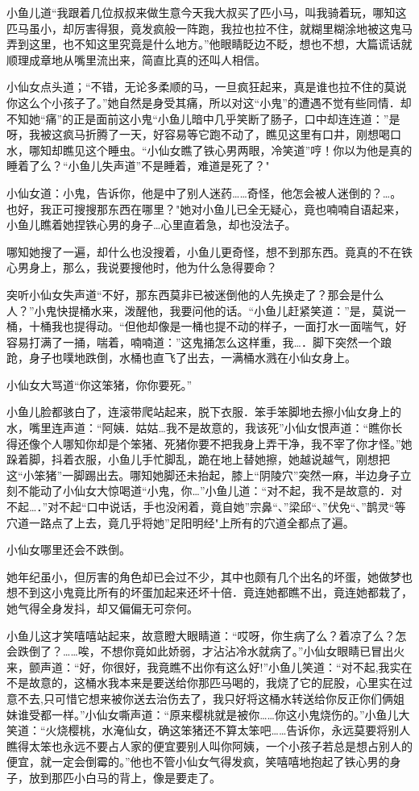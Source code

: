 \documentclass[12pt,oneside]{book}
\begin{document}
小鱼儿道``我跟着几位叔叔来做生意今天我大叔买了匹小马，叫我骑着玩，哪知这匹马虽小，却厉害得狠，竟发疯般一阵跑，我拉也拉不住，就糊里糊涂地被这鬼马弄到这里，也不知这里究竟是什么地方。''他眼睛眨边不眨，想也不想，大篇谎话就顺理成章地从嘴里流出来，简直比真的还叫人相信。

小仙女点头道；``不错，无论多柔顺的马，一旦疯狂起来，真是谁也拉不住的莫说你这么个小孩子了。''她自然是身受其痛，所以对这``小鬼''的遭遇不觉有些同情．却不知她``痛''的正是面前这小鬼``小鱼儿暗中几乎笑断了肠子，口中却连连道：''是呀，我被这疯马折腾了一天，好容易等它跑不动了，瞧见这里有口井，刚想喝口水，哪知却瞧见这个睡虫。``小仙女瞧了铁心男两眼，冷笑道''哼！你以为他是真的睡着了么？``小鱼儿失声道''不是睡着，难道是死了？"

小仙女道：小鬼，告诉你，他是中了别人迷药\ldots\ldots 奇怪，他怎会被人迷倒的？\ldots。也好，我正可搜搜那东西在哪里？"她对小鱼儿已全无疑心，竟也喃喃自语起来，小鱼儿瞧着她捏铁心男的身子\ldots 心里直着急，却也没法子。

哪知她搜了一遍，却什么也没搜着，小鱼儿更奇怪，想不到那东西。竟真的不在铁心男身上，那么，我说要搜他时，他为什么急得要命？

突听小仙女失声道``不好，那东西莫非已被迷倒他的人先换走了？那会是什么人？''小鬼快提桶水来，泼醒他，我要问他的话。``小鱼儿赶紧笑道：''是，莫说一桶，十桶我也提得动。``但他却像是一桶也提不动的样子，一面打水一面喘气，好容易打满了一捅，喘着，喃喃道：''这鬼捅怎么这样重，我\ldots．脚下突然一个踉跄，身子也噗地跌倒，水桶也直飞了出去，一满桶水溅在小仙女身上。

小仙女大骂道``你这笨猪，你你要死。''

小鱼儿脸都骇白了，连滚带爬站起来，脱下衣服．笨手笨脚地去擦小仙女身上的水，嘴里连声道：``阿姨．姑姑\ldots 我不是故意的，我该死''小仙女恨声道：``瞧你长得还像个人哪知你却是个笨猪、死猪你要不把我身上弄干净，我不宰了你才怪。''她跺着脚，抖着衣服，小鱼儿手忙脚乱，跪在地上替她擦，她越说越气，刚想把这``小笨猪''一脚踢出去。哪知她脚还未抬起，膝上``阴陵穴''突然一麻，半边身子立刻不能动了小仙女大惊喝道``小鬼，你\ldots{}''小鱼儿道：``对不起，我不是故意的．对不起\ldots．''对不起``口中说话，手也没闲着，竟自她''宗鼻``、''梁邱``、''伏免``、''鹊灵``等穴道一路点了上去，竟几乎将她''足阳明经"上所有的穴道全都点了遍。

小仙女哪里还会不跌倒。

她年纪虽小，但厉害的角色却已会过不少，其中也颇有几个出名的坏蛋，她做梦也想不到这小鬼竟比所有的坏蛋加起来还坏十倍．竟连她都瞧不出，竟连她都栽了，她气得全身发抖，却又偏偏无可奈何。

小鱼儿这才笑嘻嘻站起来，故意瞪大眼睛道：``哎呀，你生病了么？着凉了么？怎会跌倒了？\ldots\ldots 唉，不想你竟如此娇弱，才沾沾冷水就病了。''小仙女眼睛已冒出火来，颤声道：``好，你很好，我竟瞧不出你有这么好!''小鱼儿笑道：``对不起,我实在不是故意的，这桶水我本来是要送给你那匹马喝的，我烧了它的屁股，心里实在过意不去,只可惜它想来被你送去治伤去了，我只好将这桶水转送给你反正你们俩姐妹谁受都一样。''小仙女嘶声道：``原来樱桃就是被你\ldots\ldots 你这小鬼烧伤的。''小鱼儿大笑道：``火烧樱桃，水淹仙女，确这笨猪还不算太笨吧\ldots\ldots 告诉你，永远莫要将别人瞧得太笨也永远不要占人家的便宜要别人叫你阿姨，一个小孩子若总是想占别人的便宜，就一定会倒霉的。''他也不管小仙女气得发疯，笑嘻嘻地抱起了铁心男的身子，放到那匹小白马的背上，像是要走了。
\end{document}

